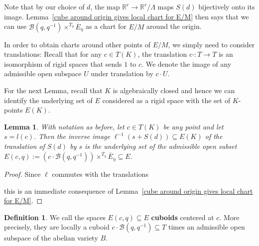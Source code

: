 \documentclass[10pt,oneside]{amsart}
\newtheorem{lemma}[theorem]{Lemma}
\theoremstyle{definition}
\newtheorem{definition}[theorem]{Definition}
\begin{document}
	
	Note that by our choice of $d$, the map $\mathbb R^r\rightarrow \mathbb R^r/\Lambda$ maps $S(d)$ bijectively onto its image. 
	Lemma~\ref{cube around origin gives local chart for E/M} then says that we can use $\mathcal B(q,q^{-1})\times^{\overline{T}_\eta}\overline{E}_\eta$ as a chart for $E/M$ around the origin.
	
	In order to obtain charts around other points of $E/M$, we simply need to consider translations: Recall that for any $c\in T(K)$, the translation
	$c\cdot :T\rightarrow T$
	is an isomorphism of rigid spaces that sends $1$ to $c$. We denote the image of any admissible open subspace $U$ under translation by $c\cdot U$.
	
	For the next Lemma, recall that $K$ is algebraically closed and hence we can identify the underlying set of $E$ considered as a rigid space with the set of $K$-points $E(K)$.
	
	\begin{lemma}\label{cube around point gives local chart for E/M}
		With notation as before, let $c \in T(K)$ be any point and let $s=l(c)$. Then the inverse image $\ell^{-1}(s+S(d))\subseteq E(K)$ of the translation of $S(d)$ by $s$ is the underlying set of the admissible open subset $E(c,q) := (c\cdot \mathcal B(q,q^{-1}))\times^{\overline{T}_\eta}\overline{E}_\eta \subseteq E$.
	\end{lemma}
	
	\begin{proof}
		Since $\ell$ commutes with the translations
		\begin{center}
		\end{center}
		this is an immediate consequence of Lemma~\ref{cube around origin gives local chart for E/M}.
	\end{proof}
    
    \begin{definition}\label{defininition of cuboid}
		We call the spaces $E(c,q)\subseteq E$ \textbf{cuboids} centered at $c$. More precisely, they are locally a cuboid   $c\cdot\mathcal B(q,q^{-1})\subseteq T$ times an admissible open subspace of the abelian variety $B$. 
	\end{definition}
    
\end{document}
